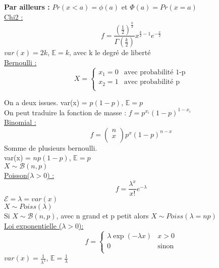 \documentclass[../main.tex]{subfiles}
\begin{document}
\textbf{Par ailleurs :} $Pr(x<a) = \phi(a)$ et $\Phi(a) = Pr(x=a)$\\

\quad \underline{Chi2 :}\\
\begin{equation}
    f = \frac{(\frac{1}{2})^{\frac{k}{2}}}{\Gamma(\frac{k}{2})} x^{\frac{k}{2}-1} e^{-\frac{x}{2}}
\end{equation}
$var(x) = 2k$, $\mathbb{E} = k$, avec k le degré de liberté\\

\quad \underline{Bernoulli :}\\
\begin{equation}
    X = \left\{
    \begin{array}{cc}
        x_1 = 0 & \textrm{avec probabilité 1-p} \\
        x_2 = 1 & \textrm{avec probabilité p}\\
    \end{array}
    \right.
\end{equation}

On a deux issues. var(x) = $p(1-p)$, $\mathbb{E} = p$\\
On peut traduire la fonction de masse : $f = p^{x_i}(1-p)^{1-x_i}$\\

\quad \underline{Binomial :}\\
\begin{equation}
    f = \begin{pmatrix}
        n\\x\\
    \end{pmatrix} p^x (1-p)^{n-x}
\end{equation}
Somme de plusieurs bernoulli.\\
var(x) = $np(1-p)$, $\mathbb{E} = p$\\
$X\sim \mathcal{B}(n,p)$\\

\quad \underline{Poisson($\lambda>0$) : }\\
\begin{equation}
    f = \frac{\lambda^x}{x!} e^{-\lambda}
\end{equation}
$\mathcal{E} = \lambda = var(x)$\\
$X\sim Poiss(\lambda)$\\
Si $X\sim \mathcal{B}(n,p)$, avec n grand et p petit alors $X\sim Poiss(\lambda = np)$\\

\quad \underline{Loi exponentielle ($\lambda>0$):}\\
\begin{equation}
    f = \left\{
    \begin{array}{cc}
        \lambda \exp(-\lambda x) & x>0 \\
        0 & \textrm{sinon}\\
    \end{array}
    \right.
\end{equation}
$var(x) = \frac{1}{\lambda^2}$, $\mathbb{E} = \frac{1}{\lambda}$\\
\end{document}
